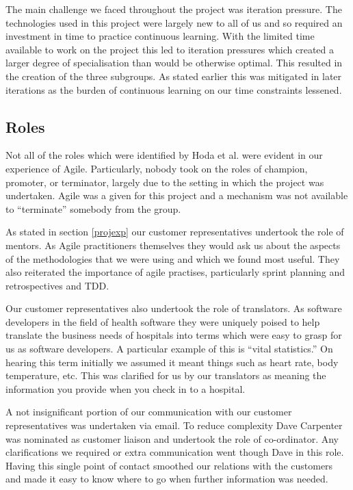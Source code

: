 \documentclass[conference]{IEEEtran}
\begin{document}
The main challenge we faced throughout the project was iteration pressure. The
technologies used in this project were largely new to all of us and so required
an investment in time to practice continuous learning. With the limited time
available to work on the project this led to iteration pressures which created a
larger degree of specialisation than would be otherwise optimal. This resulted
in the creation of the three subgroups. As stated earlier this was mitigated in
later iterations as the burden of continuous learning on our time constraints
lessened.

\subsection{Roles}

Not all of the roles which were identified by Hoda et al.
\cite{hoda2010organizing} were evident in our experience of Agile. Particularly,
nobody took on the roles of champion, promoter, or terminator, largely due to
the setting in which the project was undertaken. Agile was a given for this
project and a mechanism was not available to ``terminate'' somebody from the
group.

As stated in section \ref{projexp} our customer representatives undertook the
role of mentors. As Agile practitioners themselves they would ask us about the
aspects of the methodologies that we were using and which we found most useful.
They also reiterated the importance of agile practises, particularly sprint
planning and retrospectives and TDD.

Our customer representatives also undertook the role of translators. As software
developers in the field of health software they were uniquely poised to help
translate the business needs of hospitals into terms which were easy to grasp
for us as software developers. A particular example of this is ``vital
statistics.'' On hearing this term initially we assumed it meant things such as
heart rate, body temperature, etc. This was clarified for us by our translators
as meaning the information you provide when you check in to a hospital.

A not insignificant portion of our communication with our customer
representatives was undertaken via email. To reduce complexity Dave Carpenter
was nominated as customer liaison and undertook the role of co-ordinator. Any
clarifications we required or extra communication went though Dave in this role.
Having this single point of contact smoothed our relations with the customers
and made it easy to know where to go when further information was needed.
\end{document}
